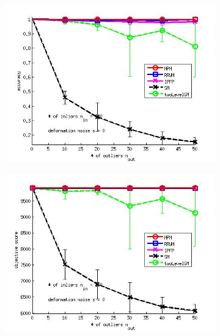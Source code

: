 \documentclass[
	fontsize=12pt,
	paper=a4,
	twoside=false,
	numbers=noenddot,
	plainheadsepline,
	toc=listof,
	toc=bibliography
]{scrartcl}
\begin{document}
\begin{figure}[h] 
	\begin{subfigure}[b]{0.3\textwidth}
		\centering
		\includegraphics[scale=0.25]{"fig_ver2608/syntheticPointSets/ver4.3.2/outliertest_nodeform_n50/accuracy_avg10t"} 
	\end{subfigure}%
	\begin{subfigure}[b]{0.3\textwidth}
		\centering
		\includegraphics[scale=0.25]{"fig_ver2608/syntheticPointSets/ver4.3.2/outliertest_nodeform_n50/score_avg10t"} 
	\end{subfigure} 
	\begin{subfigure}[b]{0.3\textwidth}
		\centering

\end{subfigure}
\end{figure}
\end{document}
